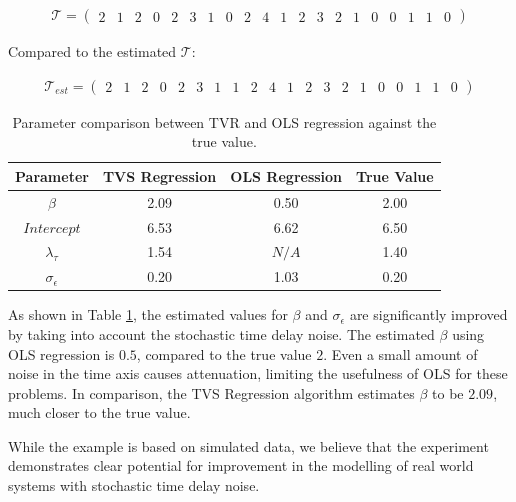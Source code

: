 \documentclass[11pt]{amsart}
\theoremstyle{definition}
\begin{document}
\begin{align*}
\mathcal{T} = 
\left(
\begin{array}{cccccccccccccccccccc}
2 & 1 & 2 & 0 & 2 & 3 & 1 & 0 & 2 & 4 & 1 & 2 & 3 & 2 & 1 & 0  & 0 & 1 & 1 & 0 
\end{array}  
\right)
\end{align*}
\newline

Compared to the estimated $\mathcal{T}$:

\begin{align*}
\mathcal{T}_{est} = 
\left(
\begin{array}{cccccccccccccccccccc}   
2 & 1 & 2 & 0 & 2 & 3 & 1 & 1 & 2 & 4 & 1 & 2 & 3 & 2 & 1 & 0  & 0 & 1 & 1 & 0 
\end{array}  
\right)
\end{align*}



\begin{center}
\begin{table}
\begin{tabular}{|c|c|c|c|}
\hline
Parameter & TVS Regression & OLS Regression & True Value \\
\hline
$\beta$ & 2.09 & 0.50 & 2.00  \\
\hline
$Intercept$ & 6.53 & 6.62 & 6.50 \\
\hline
$\lambda_{\tau}$ & 1.54 & $N/A$ & 1.40 \\
\hline
$\sigma_{\epsilon}$ & 0.20 & 1.03 & 0.20 \\
\hline
\end{tabular}
\caption{ Parameter comparison between TVR and OLS regression against the true value.} 
\label{results_table}
\end{table}
\end{center}

As shown in Table \ref{results_table}, the estimated values for $\beta$ and $\sigma_{\epsilon}$ are significantly improved by taking into account the stochastic time delay noise. The estimated $\beta$ using OLS regression is $0.5$, compared to the true value $2$. Even a small amount of noise in the time axis causes attenuation, 
limiting the usefulness of OLS for these problems.
In comparison, the TVS Regression algorithm estimates $\beta$ to be $2.09$, much closer to the true value.

While the example is based on simulated data, we believe that the experiment demonstrates clear potential for improvement in the modelling of real world systems with stochastic time delay noise.
\end{document}
